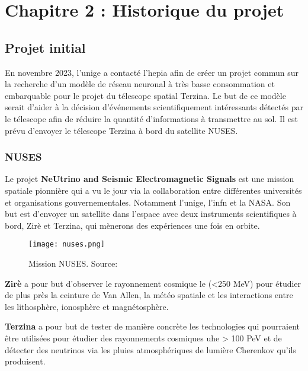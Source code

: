 \chapter{Chapitre 2 : Historique du projet}

\section{Projet initial}

En novembre 2023, l'\gls{unige} a contacté l'\gls{hepia} afin de créer un projet commun sur la recherche d'un modèle de 
réseau neuronal à très basse consommation et embarquable pour le projet du télescope spatial Terzina. 
Le but de ce modèle serait d'aider à la décision d'événements scientifiquement intéressants 
détectés par le télescope afin de réduire la quantité d'informations à transmettre au sol. 
Il est prévu d'envoyer le télescope Terzina à bord du satellite NUSES.

\subsection{NUSES}
Le projet \textbf{NeUtrino and Seismic Electromagnetic Signals} est une mission spatiale pionnière qui 
a vu le jour via la collaboration entre différentes universités et organisations gouvernementales. \cite{Nuses}
Notamment l'\gls{unige}, l'\gls{infn} et la NASA.
Son but est d'envoyer un satellite dans l'espace avec deux instruments scientifiques à bord, Zirè et Terzina, qui mènerons 
des expériences une fois en orbite.

\begin{figure}[tbph!]
	\centering
	\texttt{[image: nuses.png]}
	\caption[Mission NUSES]{Mission NUSES. Source: \cite{Nuses}}
\end{figure}

\textbf{Zirè} a pour but d'observer le rayonnement cosmique \gls{le} (<250 MeV) pour étudier de plus près la ceinture de Van Allen,
la météo spatiale et les interactions entre les lithosphère, ionosphère et magnétosphère.

\textbf{Terzina} a pour but de tester de manière concrète les technologies qui pourraient être utilisées pour étudier des rayonnements cosmiques
\gls{uhe} > 100 PeV et de détecter des neutrinos via les pluies atmosphériques de lumière Cherenkov qu'ils produisent.


